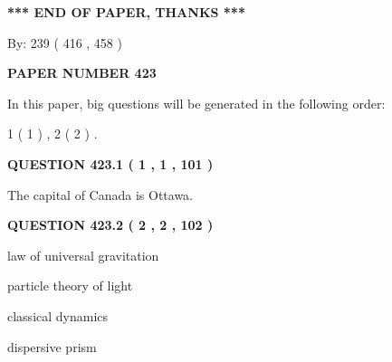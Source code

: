 \documentclass[12pt]{article}
\begin{document}
 
 
 
   
   
\vspace{1.0in} 
{\textbf{\large{ *** END OF PAPER, THANKS *** }}} 
   
   
\hspace{1.0in} By: 
 239 ( 416 ,  458 )
   
   
   
   
\newpage 
\setcounter{page}{ 
   423001 } 
   
   
   
   
 {\textbf{ \Large{ PAPER NUMBER  423  }}}
   
   
\vspace{0.2in}
   
   
   
   
   
\vspace{0.2in}
   
In this paper, big questions will be generated in the following order: 
   
   
   1 ( 1 )
 ,
   2 ( 2 )
 .
  
\vspace{0.2in}
  
{\textbf{\Large{QUESTION
423.1 
 ( 1 , 1 , 101 )
}}}
  
  
 
 
\noindent{}
 
 
The capital of Canada is Ottawa.
 
 
 
 
  
\vspace{0.2in}
  
{\textbf{\Large{QUESTION
423.2 
 ( 2 , 2 , 102 )
}}}
  
  
 
 
\noindent{}
 
 
law of universal gravitation
 
 
particle theory of light
 
 
classical dynamics
 
 
dispersive prism
 
\end{document}
